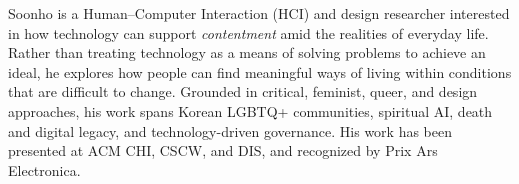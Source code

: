 Soonho is a Human–Computer Interaction (HCI) and design researcher interested in how technology can support \textit{contentment} amid the realities of everyday life. Rather than treating technology as a means of solving problems to achieve an ideal, he explores how people can find meaningful ways of living within conditions that are difficult to change. Grounded in critical, feminist, queer, and design approaches, his work spans Korean LGBTQ+ communities, spiritual AI, death and digital legacy, and technology-driven governance. His work has been presented at ACM CHI, CSCW, and DIS, and recognized by Prix Ars Electronica.